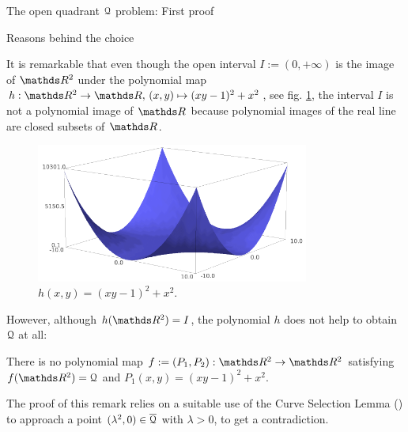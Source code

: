 \documentclass[11pt, a4paper, english, twoside, notitlepage, openright]{report}
\begin{document}
\begin{chapter}{The open quadrant $\mathcal{Q}$ problem: First proof}
\begin{section}{Reasons behind the choice}\label{quadReasons}
		
It is remarkable that even though the open interval $I:=(0,+\infty)$ is the image of $\R^2$ under the polynomial map $h:\R^2\to\R,\, (x,y)\mapsto (xy-1)^2+x^2$, see fig. \ref{fig:h(x,y)}, the interval $I$ is not a polynomial image of $\R$ because polynomial images of the real line are closed subsets of $\R$.
\begin{figure}[h]
\begin{center}
\includegraphics[width=0.8\textwidth]{plots/ch1_03_f(x,y).png}
\caption{$h(x,y)=(xy-1)^2+x^2$.\label{fig:h(x,y)}}
\end{center}
\end{figure}
		
However, although $h(\R^2)=I$, the polynomial $h$ does not help to obtain $\mathcal{Q}$ at all:
\begin{remark}
There is no polynomial map $f:=(P_1, P_2):\R^2\to\R^2$ satisfying $f(\R^2)=\Qu$ and $P_1(x,y)=(xy-1)^2+x^2$.
\end{remark}
The proof of this remark relies on a suitable use of the Curve Selection Lemma (\cite[VIII.2.6]{abr}) to approach a point $(\lambda^2,0)\in\overline{\mathcal{Q}}$ with $\lambda>0$, to get a contradiction.
		

\end{section}
\end{chapter}
\end{document}
